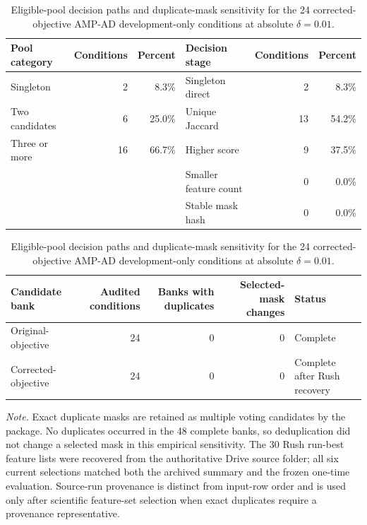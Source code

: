 \begin{table}[H]
\centering
\caption{Eligible-pool decision paths and duplicate-mask sensitivity for the 24 corrected-objective AMP-AD development-only conditions at absolute $\delta=0.01$.}
\label{tab:supp4}
\scriptsize
\setlength{\tabcolsep}{4.2pt}
\renewcommand{\arraystretch}{1.08}
\begin{tabular}{lrr@{\hspace{1.2cm}}lrr}
\toprule
Pool category & Conditions & Percent & Decision stage & Conditions & Percent \\
\midrule
Singleton & 2 & 8.3\% & Singleton direct & 2 & 8.3\% \\
Two candidates & 6 & 25.0\% & Unique Jaccard & 13 & 54.2\% \\
Three or more & 16 & 66.7\% & Higher score & 9 & 37.5\% \\
 & & & Smaller feature count & 0 & 0.0\% \\
 & & & Stable mask hash & 0 & 0.0\% \\
\bottomrule
\end{tabular}

\vspace{0.8em}
\begin{tabular}{lrrrl}
\toprule
Candidate bank & Audited conditions & Banks with duplicates & Selected-mask changes & Status \\
\midrule
Original-objective & 24 & 0 & 0 & Complete \\
Corrected-objective & 24 & 0 & 0 & Complete after Rush recovery \\
\bottomrule
\end{tabular}
\par\smallskip
\parbox{0.98\linewidth}{\scriptsize\textit{Note.} Exact duplicate masks are retained as multiple voting candidates by the package. No duplicates occurred in the 48 complete banks, so deduplication did not change a selected mask in this empirical sensitivity. The 30 Rush run-best feature lists were recovered from the authoritative Drive source folder; all six current selections matched both the archived summary and the frozen one-time evaluation. Source-run provenance is distinct from input-row order and is used only after scientific feature-set selection when exact duplicates require a provenance representative.}
\end{table}
